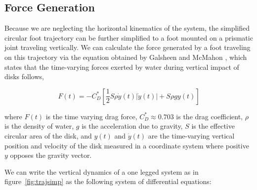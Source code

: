 \subsection{Force Generation}
Because we are neglecting the horizontal kinematics of the system, the simplified circular foot trajectory can be further simplified to a foot mounted on a prismatic joint traveling vertically. We can calculate the force generated by a foot traveling on this trajectory via the equation obtained by Galsheen and McMahon \cite{glasheen1996vertical}, which states that the time-varying forces exerted by water during vertical impact of disks follows,

\begin{equation}
	F(t) = - C_D^* \left[\frac{1}{2} S \rho \dot{y}(t) |\dot{y}(t) | + S \rho g y(t) \right]
	\label{eq:force_t}
\end{equation}

\noindent where $F(t)$ is the time varying drag force, $C_D^* \approx 0.703$ is the drag coefficient, $\rho$ is the density of water, $g$ is the acceleration due to gravity, $S$ is the effective circular area of the disk, and $y(t)$ and $\dot{y}(t)$ are the time-varying vertical position and velocity of the disk measured in a coordinate system where positive $y$ opposes the gravity vector. 

We can write the vertical dynamics of a one legged system as in figure~\ref{fig:trajsimp} as the following system of differential equations:

